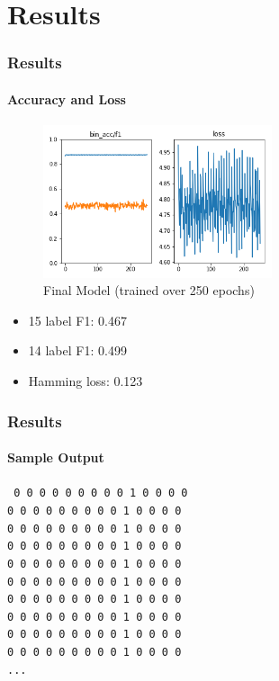 \newcommand{\overtitle}{Results}
\section{Results}


\begin{frame}
	\frametitle{\overtitle}
	\framesubtitle{Accuracy and Loss}
	\begin{figure}
		\includegraphics[width=0.6\textwidth]{images/final_model.png}
		\caption{Final Model (trained over 250 epochs)}
	\end{figure}
	\begin{itemize}
		\item 15 label F1: 0.467
		\item 14 label F1:  0.499
		\item Hamming loss: 0.123
	\end{itemize}
\end{frame}

\begin{frame}
	\frametitle{\overtitle}
	\framesubtitle{Sample Output}
	\begin{centering}
	\texttt{%
		0 0 0 0 0 0 0 0 0 1 0 0 0 0 \\
		0 0 0 0 0 0 0 0 0 1 0 0 0 0 \\
		0 0 0 0 0 0 0 0 0 1 0 0 0 0 \\
		0 0 0 0 0 0 0 0 0 1 0 0 0 0 \\
		0 0 0 0 0 0 0 0 0 1 0 0 0 0 \\
		0 0 0 0 0 0 0 0 0 1 0 0 0 0 \\
		0 0 0 0 0 0 0 0 0 1 0 0 0 0 \\
		0 0 0 0 0 0 0 0 0 1 0 0 0 0 \\
		0 0 0 0 0 0 0 0 0 1 0 0 0 0 \\
		0 0 0 0 0 0 0 0 0 1 0 0 0 0 \\
		...
		}
	\end{centering}
\end{frame}

